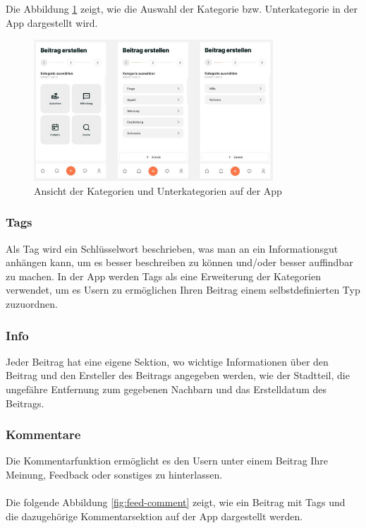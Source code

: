 Die Abbildung \ref{fig:categories} zeigt, wie die Auswahl der Kategorie bzw. Unterkategorie in der App dargestellt wird.

\begin{figure}[H]
  \centering
  \includegraphics[width=0.8\textwidth]{pics/categories.JPG}
  \caption{Ansicht der Kategorien und Unterkategorien auf der App}
  \label{fig:categories}
\end{figure}


\subsubsection{Tags}
Als Tag wird ein Schlüsselwort beschrieben, was man an ein Informationsgut anhängen kann, um es besser beschreiben zu können und/oder besser auffindbar zu machen. In der App werden Tags als eine Erweiterung der Kategorien verwendet, um es Usern zu ermöglichen Ihren Beitrag einem selbstdefinierten Typ zuzuordnen.

\subsubsection{Info}
Jeder Beitrag hat eine eigene Sektion, wo wichtige Informationen über den Beitrag und den Ersteller des Beitrags angegeben werden, wie der Stadtteil, die ungefähre Entfernung zum gegebenen Nachbarn und das Erstelldatum des Beitrags.

\subsubsection{Kommentare}
Die Kommentarfunktion ermöglicht es den Usern unter einem Beitrag Ihre Meinung, Feedback oder sonstiges zu hinterlassen.
\\\\
Die folgende Abbildung \ref{fig:feed-comment} zeigt, wie ein Beitrag mit Tags und die dazugehörige Kommentarsektion auf der App dargestellt werden.

